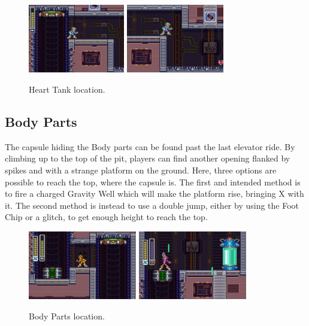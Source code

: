 \begin{figure}[htp]
	\centering
	\includegraphics[height=3cm]{figures/X3/Volt_catfish/heart_1.jpg}
	\includegraphics[height=3cm]{figures/X3/Volt_catfish/heart_2.jpg}
	\caption{Heart Tank location.}
\end{figure}

\subsection{Body Parts}
The capsule hiding the Body parts can be found past the last elevator ride. By climbing up to the top of the pit, players can find another opening flanked by spikes and with a strange platform on the ground. Here, three options are possible to reach the top, where the capsule is. The first and intended method is to fire a charged Gravity Well  which will make the platform rise, bringing X with it. The second method is instead to use a double jump, either by using the Foot Chip or a glitch, to get enough height to reach the top. 

\begin{figure}[htp]
	\centering
	\includegraphics[height=3cm]{figures/X3/Volt_catfish/Armor_1.png}
	\includegraphics[height=3cm]{figures/X3/Volt_catfish/Armor_2.png}
	\caption{Body Parts location.}
\end{figure}

